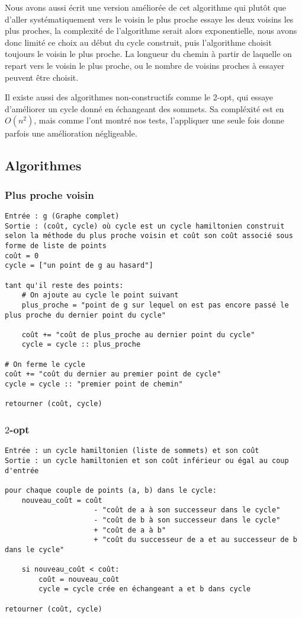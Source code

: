 \documentclass{scrartcl}
\begin{document}
    Nous avons aussi écrit une version améliorée de cet algorithme qui plutôt
    que d'aller systématiquement vers le voisin le plus proche essaye les deux
    voisins les plus proches, la complexité de l'algorithme serait alors
    exponentielle, nous avons donc limité ce choix au début du cycle construit,
    puis l'algorithme choisit toujours le voisin le plus proche. La longueur du
    chemin à partir de laquelle on repart vers le voisin le plus proche, ou le
    nombre de voisins proches à essayer peuvent être choisit.

    Il existe aussi des algorithmes non-constructifs comme le 2-opt, qui essaye
    d'améliorer un cycle donné en échangeant des sommets. Sa compléxité est en
    $O(n^2)$, mais comme l'ont montré nos tests, l'appliquer une seule fois
    donne parfois une amélioration négligeable.

  \subsection{Algorithmes}
    \subsubsection{Plus proche voisin}
      \begin{lstlisting}
Entrée : g (Graphe complet)
Sortie : (coût, cycle) où cycle est un cycle hamiltonien construit selon la méthode du plus proche voisin et coût son coût associé sous forme de liste de points
coût = 0
cycle = ["un point de g au hasard"]

tant qu'il reste des points:
    # On ajoute au cycle le point suivant
    plus_proche = "point de g sur lequel on est pas encore passé le plus proche du dernier point du cycle"

    coût += "coût de plus_proche au dernier point du cycle"
    cycle = cycle :: plus_proche

# On ferme le cycle
coût += "coût du dernier au premier point de cycle"
cycle = cycle :: "premier point de chemin"

retourner (coût, cycle)
      \end{lstlisting}

    \subsubsection{$2$-opt}
      \begin{lstlisting}
Entrée : un cycle hamiltonien (liste de sommets) et son coût
Sortie : un cycle hamiltonien et son coût inférieur ou égal au coup d'entrée

pour chaque couple de points (a, b) dans le cycle:
    nouveau_coût = coût
                     - "coût de a à son successeur dans le cycle"
                     - "coût de b à son successeur dans le cycle"
                     + "coût de a à b"
                     + "coût du successeur de a et au successeur de b dans le cycle"

    si nouveau_coût < coût:
        coût = nouveau_coût
        cycle = cycle crée en échangeant a et b dans cycle

retourner (coût, cycle)
      \end{lstlisting}
\end{document}
